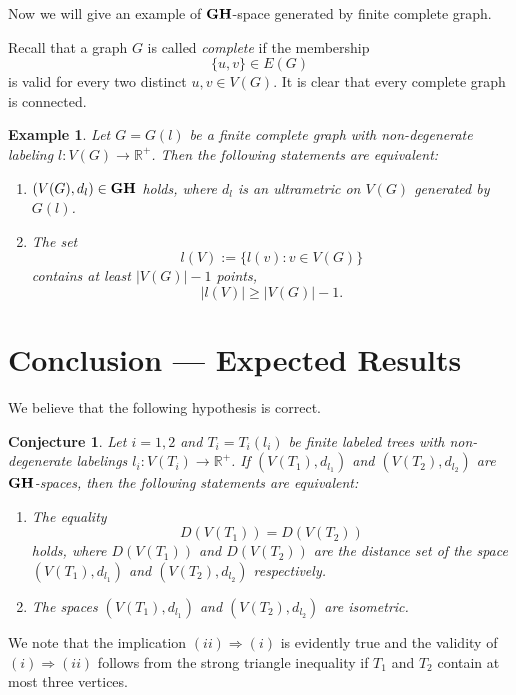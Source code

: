 \documentclass[pdflatex,sn-mathphys-num]{sn-jnl}%
\theoremstyle{thmstyleone}%
\newtheorem{Conjecture}[Theorem]{Conjecture}
\theoremstyle{thmstyletwo}%
\newtheorem{Example}[Theorem]{Example}
\theoremstyle{thmstylethree}%
\theoremstyle{thmstyletwo}%
\theoremstyle{thmstylethree}%
\begin{document}
Now we will give an example of $\bf GH$-space generated by finite complete graph.


Recall that a graph $G$ is called {\it complete} if the membership 
\begin{equation*}
    \{u,v\} \in E(G)
\end{equation*}
is valid for every two distinct $u,v \in V(G)$. It is clear that every complete graph is connected.


\begin{Example}\label{hlo}
 Let $G = G(l)$ be a finite complete graph with  non-degenerate labeling $l : V(G) \to \mathbb{R}^+$. Then the following statements are equivalent:
\begin{enumerate}
    \item [(i)] $(V(G), d_l) \in {\bf GH}$ holds, where $d_l$ is an ultrametric on $V(G)$ generated by $G(l)$.
\item[(ii)] The set
\[
l(V) := \{ l(v) : v \in V(G) \}
\]
contains at least $|V(G)| - 1$ points, 
\[
|l(V)| \geq |V(G)| - 1.
\]
\end{enumerate}
\end{Example}



\section{Conclusion --- Expected Results}\label{sec4}


We believe that the following hypothesis is correct.

\begin{Conjecture}\label{far}
Let $i=1,2$ and $T_i=T_i(l_i)$  be finite labeled trees with non-degenerate labelings $l_i : V(T_i) \to \mathbb{R}^+$.
If $(V(T_1), d_{l_1})$ and $(V(T_2), d_{l_2})$ are $\bf GH$-spaces, then the following statements are equivalent:
\begin{enumerate}
    \item[(i)] The equality
\[
D(V(T_1)) = D(V(T_2))
\]
holds, where  $D(V(T_1))$ and $D(V(T_2))$  are  the distance set of the  space $(V(T_1), d_{l_1})$ and $(V(T_2), d_{l_2})$ respectively.  
\item[(ii)] The spaces $(V(T_1), d_{l_1})$ and $(V(T_2), d_{l_2})$ are isometric.
\end{enumerate}
\end{Conjecture}


We note that the implication $(ii) \Rightarrow (i)$ is evidently true  and the validity of $ (i) \Rightarrow (ii)$ follows from the strong triangle inequality if $T_1$ and $T_2$ contain at most three vertices.
\end{document}
